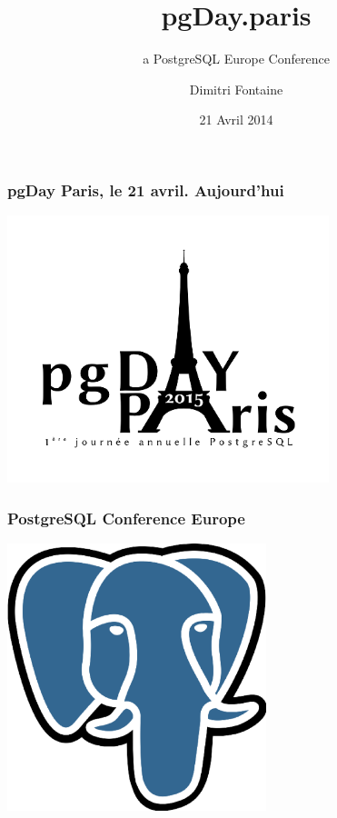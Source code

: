 \documentclass{beamer}
\title{pgDay.paris}
\subtitle{a PostgreSQL Europe Conference}
\author{Dimitri Fontaine}
\date{21 Avril 2014}
\begin{document}
\frame{\titlepage}

\begin{frame}[fragile]
  \frametitle{pgDay Paris, le 21 avril. Aujourd'hui}

  \begin{center}
    \includegraphics[height=21em]{pgdayparis.png}
  \end{center}
\end{frame}

\begin{frame}[fragile]
  \frametitle{PostgreSQL Conference Europe}

  \begin{center}
    \includegraphics[height=21em]{postgres-logo.eps}
  \end{center}
\end{frame}
\end{document}

